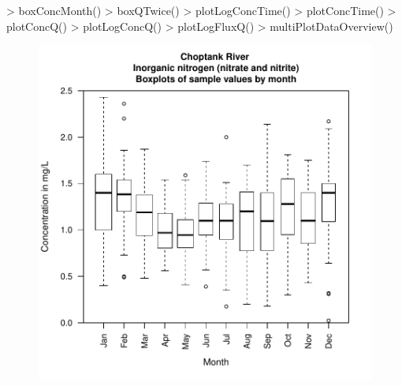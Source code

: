 \documentclass[a4paper,11pt]{article}
\begin{document}
\begin{Schunk}
\begin{Sinput}
> boxConcMonth()
> boxQTwice()
> plotLogConcTime()
> plotConcTime()
> plotConcQ()
> plotLogConcQ()
> plotLogFluxQ()
> multiPlotDataOverview()
\end{Sinput}
\end{Schunk}


\begin{figure}[htbp]
  \begin{minipage}[h]{0.5\linewidth}
    \begin{center}

\includegraphics{EGRET-figboxConcMonth}
    \label{fig:boxConcMonth}
    \end{center}
  \end{minipage}
  \begin{minipage}[h]{0.5\linewidth}
    \begin{center}



\end{center}
\end{minipage}
\end{figure}
\end{document}

